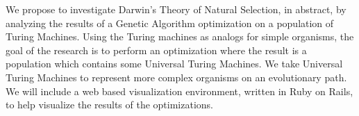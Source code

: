 We propose to investigate Darwin's Theory of Natural Selection, in abstract, by analyzing the results of a Genetic Algorithm optimization on a population of Turing Machines. Using the Turing machines as analogs for simple organisms, the goal of the research is to perform an optimization where the result is a population which contains some Universal Turing Machines. We take Universal Turing Machines to represent more complex organisms on an evolutionary path. We will include a web based visualization environment, written in Ruby on Rails, to help visualize the results of the optimizations. 
